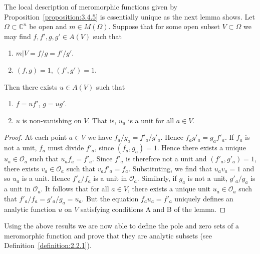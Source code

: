 The local description of meromorphic functions given by Proposition~\ref{proposition:3.4.5} is essentially unique as the next lemma shows.
 Let $\Omega\subset\mathbb C^n$ be open and $m\in M(\Omega)$. Suppose that for some open subset $V\subset\Omega$ we may find $f,f',g,g'\in A(V)$ such that
\begin{enumerate}
\item $m|V=f/g=f'/g'$.
\item $(f,g)=1$, $(f',g')=1$.
\end{enumerate}
Then there exists $u\in A(V)$ such that
\begin{enumerate}
\item[A.] $f=uf'$, $g=ug'$.
\item[B.] $u$ is non-vanishing on $V$. That is, $u_a$ is a unit for all $a\in V$.
\end{enumerate}
\begin{proof}
At each point $a\in V$ we have $f_a/g_a=f'_a/g'_a$. Hence $f_ag'_a=g_af'_a$. If $f_a$ is not a unit, $f_a$ must divide $f'_a$, since $(f_a,g_a)=1$. Hence there exists a unique $u_a\in\mathcal O_a$ such that $u_af_a=f'_a$. Since $f'_a$ is therefore not a unit and $(f'_a,g'_a)=1$, there exists $v_a\in\mathcal O_a$ such that $v_af'_a=f_a$. Substituting, we find that $u_av_a=1$ and so $u_a$ is a unit. Hence $f'_a/f_a$ is a unit in $\mathcal O_a$. Similarly, if $g_a$ is not a unit, $g'_a/g_a$ is a unit in $\mathcal O_a$. It follows that for all $a\in V$, there exists a unique unit $u_a\in\mathcal O_a$ such that $f'_a/f_a=g'_a/g_a=u_a$. But the equation $f_au_a=f'_a$ uniquely defines an analytic function $u$ on $V$ satisfying conditions A and B of the lemma.
\end{proof}
Using the above results we are now able to define the pole and zero sets of a meromorphic function and prove that they are analytic subsets (see Definition~\ref{definition:2.2.1}).

